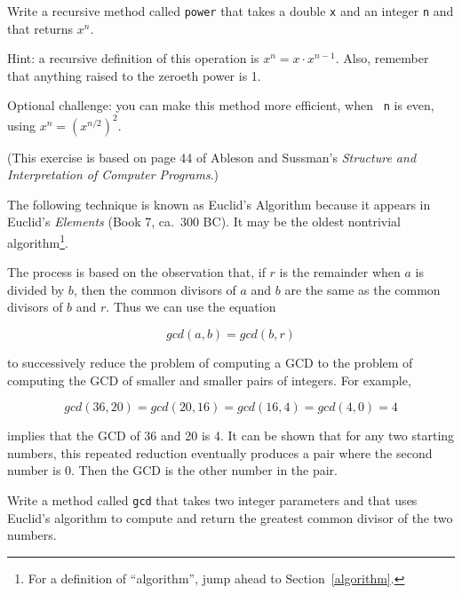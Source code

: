 \begin{exercise}
\label{ex.power}
Write a recursive method called {\tt power} that
takes a double {\tt x} and an integer {\tt n} and that
returns $x^n$.

Hint: a recursive definition of this
operation is $x^n = x \cdot x^{n-1}$.
Also, remember that anything raised to the zeroeth power
is 1.

Optional challenge: you can make this method more efficient, when {\tt
  n} is even, using $x^n = \left( x^{n/2} \right)^2$.

\end{exercise}


\begin{exercise}
\label{gcd}
(This exercise is based on page 44 of Ableson and Sussman's
{\em Structure and Interpretation of Computer Programs}.)

The following technique is known as Euclid's Algorithm because
it appears in Euclid's {\em Elements} (Book 7, ca.~300 BC).
It may be the oldest nontrivial algorithm\footnote{For a definition
of ``algorithm'', jump ahead to Section~\ref{algorithm}.}.

The process is based on the observation that, if $r$ is the
remainder when $a$ is divided by $b$, then the common divisors
of $a$ and $b$ are the same as the common divisors of $b$ and $r$.
Thus we can use the equation

\[ gcd(a, b) = gcd(b, r) \]

to successively reduce the problem of computing a GCD to the
problem of computing the GCD of smaller and smaller pairs of integers.
For example,

\[ gcd(36, 20) = gcd(20, 16) = gcd(16, 4) = gcd(4, 0) = 4 \]

implies that the GCD of 36 and 20 is 4.  It can be shown
that for any two starting numbers, this repeated reduction eventually
produces a pair where the second number is 0.  Then the GCD is the
other number in the pair.

Write a method called {\tt gcd} that takes two integer parameters and
that uses Euclid's algorithm to compute and return the greatest
common divisor of the two numbers.
\end{exercise}


